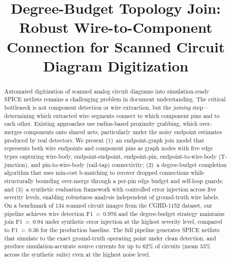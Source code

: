 \documentclass[conference]{IEEEtran}
\begin{document}
\title{Degree-Budget Topology Join: Robust Wire-to-Component\\Connection for Scanned Circuit Diagram Digitization}

\author{%
\and
{}
\and
{}
}

\maketitle

\begin{abstract}
Automated digitization of scanned analog circuit diagrams into simulation-ready SPICE netlists remains a challenging problem in document understanding. The critical bottleneck is not component detection or wire extraction, but the \emph{joining} step---determining which extracted wire segments connect to which component pins and to each other. Existing approaches use radius-based proximity grabbing, which over-merges components onto shared nets, particularly under the noisy endpoint estimates produced by real detectors. We present (1)~an endpoint-graph join model that represents both wire endpoints and component pins as graph nodes with five edge types capturing wire-body, endpoint-endpoint, endpoint-pin, endpoint-to-wire-body (T-junction), and pin-to-wire-body (rail-tap) connectivity; (2)~a degree-budget completion algorithm that uses min-cost b-matching to recover dropped connections while structurally bounding over-merge through a per-pin edge budget and self-loop guards; and (3)~a synthetic evaluation framework with controlled error injection across five severity levels, enabling robustness analysis independent of ground-truth wire labels. On a benchmark of 134 scanned circuit images from the CGHD-1152 dataset, our pipeline achieves wire detection F1~=~0.976 and the degree-budget strategy maintains join F1~=~0.94 under synthetic error injection at the highest severity level, compared to F1~=~0.36 for the production baseline. The full pipeline generates SPICE netlists that simulate to the exact ground-truth operating point under clean detection, and produce simulation-accurate source currents for up to 62\% of circuits (mean 33\% across the synthetic suite) even at the highest noise level.
\end{abstract}
\end{document}
